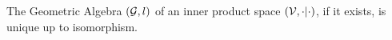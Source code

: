 \begin{theorem}[Uniqueness]\label{t:uniqueness}
	The Geometric Algebra $(\mathcal{G},l)$ of an inner product space $(\mathcal{V}, \cdot|\cdot)$, if it exists, is unique up to isomorphism.
\end{theorem}
